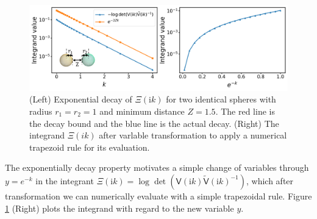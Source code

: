\begin{figure}[H]
    \centering
    \includegraphics[width = \textwidth]{figures/Scalar_integ_decay.png}
    \caption{(Left) Exponential decay of $\Xi(\textrm{i}k)$ for two identical spheres with radius $r_1 = r_2 =1$ and minimum distance $Z=1.5$. The red line is the decay bound and the blue line is the actual decay. (Right) The integrand $\Xi(ik)$ after varlable transformation to apply a numerical trapezoid rule for its evaluation.}
    \label{The integrand decays exponentially}
\end{figure}

The exponentially decay property motivates a simple change of variables through $y = e^{-k}$ in the integrant $\Xi(\mathrm{i}k) = \log\det(\mathsf{V}(\mathrm{i}k)\tilde{\mathsf{V}}(\mathrm{i}k)^{-1})$, 
which after transformation we can numerically evaluate with a simple trapezoidal rule. Figure \ref{The integrand decays exponentially} (Right) plots the integrand with regard to the new variable $y$.
